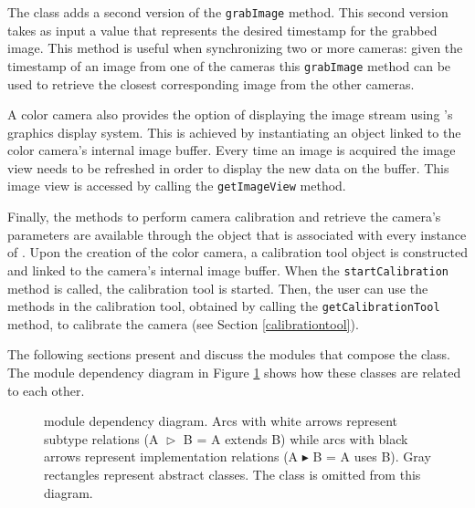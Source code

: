 The \ColorCam{} class adds a second version of the \texttt{grab\-Im\-age} method. This second version takes
as input a value that represents the desired timestamp for the grabbed image. This method is 
useful when synchronizing two or more cameras: given the timestamp of an image from one of the cameras
this \texttt{grab\-Im\-age} method can be used to retrieve the closest corresponding image from the other
cameras.  

A color camera also provides the option of displaying the image stream using \RD{}'s graphics display system.
This is achieved by instantiating an \ImageView{} object linked to the color camera's internal image buffer. 
Every time an image is acquired the image view needs to be refreshed in order to display the new data on the 
buffer. This image view is accessed by calling the \texttt{get\-Im\-age\-View} method.

Finally, the methods to perform camera calibration and retrieve the camera's parameters are available 
through the \CalibrationTool{} object that is associated with every instance of \ColorCam{}. Upon the creation
of the color camera, a calibration tool object is constructed and linked to the camera's internal image buffer. 
When the \texttt{start\-Cal\-i\-bra\-tion} method is called, the calibration tool is started. Then, the user can
use the methods in the calibration tool, obtained by calling the \texttt{get\-Cal\-i\-bra\-tion\-Tool} method, to 
calibrate the camera (see Section \ref{calibrationtool}). 

The following sections present and discuss the modules that compose the \ColorCam{} class. The 
module dependency diagram in Figure \ref{colorcammoduledependency} shows how these classes 
are related to each other. 

\begin{figure}[t]
\begin{center}

\caption[\ColorCam{}'s module dependency diagram]{\ColorCam{} module dependency diagram. Arcs with 
white arrows represent subtype relations (A $\vartriangleright$ B = A extends B) while arcs with black arrows 
represent implementation relations (A $\blacktriangleright$ B = A uses B). Gray rectangles represent abstract 
classes. The \ImageBuffer{} class is omitted from this diagram.}
\label{colorcammoduledependency}
\end{center}
\end{figure}


